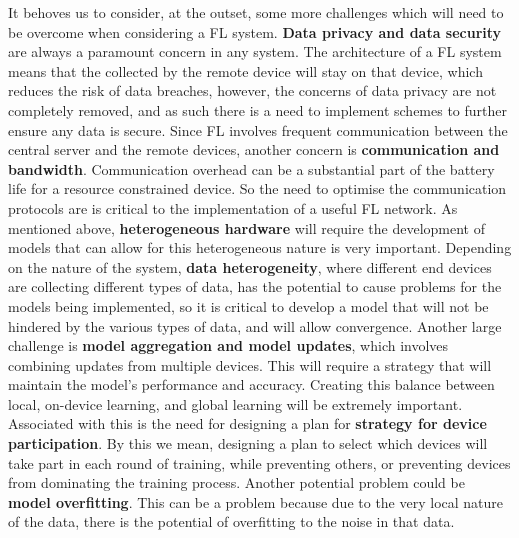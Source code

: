 \documentclass[conference]{IEEEtran}
\begin{document}
It behoves us to consider, at the outset, some more challenges which will need to be overcome when considering a FL system. \textbf{Data privacy and data security} are always a paramount concern in any system. The architecture of a FL system means that the collected by the remote device will stay on that device, which reduces the risk of data breaches, however, the concerns of data privacy are not completely removed, and as such there is a need to implement schemes to further ensure any data is secure. Since FL involves frequent communication between the central server and the remote devices, another concern is \textbf{communication and bandwidth}. Communication overhead can be a substantial part of the battery life for a resource constrained device. So the need to optimise the communication protocols are is critical to the implementation of a useful FL network. As mentioned above, \textbf{heterogeneous hardware} will require the development of models that can allow for this heterogeneous nature is very important. Depending on the nature of the system, \textbf{data heterogeneity}, where different end devices are collecting different types of data, has the potential to cause problems for the models being implemented, so it is critical to develop a model that will not be hindered by the various types of data, and will allow convergence. Another large challenge is \textbf{model aggregation and model updates}, which involves combining updates from multiple devices. This will require a strategy that will maintain the model's performance and accuracy. Creating this balance between local, on-device learning, and global learning will be extremely important. Associated with this is the need for designing a plan for \textbf{strategy for device participation}. By this we mean, designing a plan to select which devices will take part in each round of training, while preventing others, or preventing devices from dominating the training process. Another potential problem could be \textbf{model overfitting}. This can be a problem because due to the very local nature of the data, there is the potential of overfitting to the noise in that data. 


\end{document}
